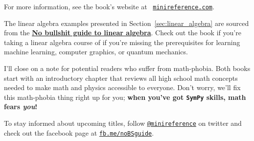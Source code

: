 \documentclass[9pt]{IEEEtran}
\begin{document}
%

%

\noindent
For more information, see the book's website %
at \,  \href{http://minireference.com/}{\texttt{minireference.com}}.

The linear algebra examples presented in Section~\ref{sec:linear_algebra} are 
sourced from the \href{https://gum.co/noBSLA}{\textbf{No bullshit guide to linear algebra}}.
Check out the book if you're taking a linear algebra course of if you're missing the prerequisites 
for learning machine learning, computer graphics, or quantum mechanics.

I'll close on a note for potential readers who suffer from math-phobia.
Both books start with an introductory chapter that reviews all 
high school math concepts needed to make math and physics 
accessible to everyone.
Don't worry, we'll fix this math-phobia thing right up for you;
\textbf{when you've got \texttt{SymPy} skills, math fears \emph{you}!}

To stay informed about upcoming titles,
follow \href{https://twitter.com/minireference}{\texttt{@minireference}} on twitter 
and check out the facebook page at \href{http://fb.me/noBSguide}{\texttt{fb.me/noBSguide}}.
\end{document}
